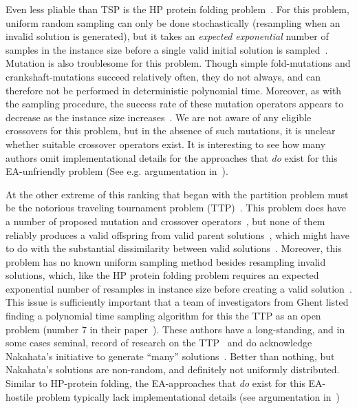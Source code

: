 \documentclass[svgnames,table,runningheads]{llncs}
\begin{document}
Even less pliable than TSP is the HP protein folding problem~\cite{dill1985theory,berger1998protein,lau1989lattice,van2023quantifying,van2026towards}. For this problem, uniform random sampling can only be done stochastically (resampling when an invalid solution is generated), but it takes an \textit{expected exponential} number of samples in the instance size before a single valid initial solution is sampled~\cite{horn2023randomly,jansen2023can}. Mutation is also troublesome for this problem. Though simple fold-mutations and crankshaft-mutations succeed relatively often, they do not always, and can therefore not be performed in deterministic polynomial time. Moreover, as with the sampling procedure, the success rate of these mutation operators appears to decrease as the instance size increases~\cite{horn2023randomly}. We are not aware of any eligible crossovers for this problem, but in the absence of such mutations, it is unclear whether suitable crossover operators exist. It is interesting to see how many authors omit implementational details for the approaches that \textit{do} exist for this EA-unfriendly problem (See e.g. argumentation in~\cite{jansen2023can}).

At the other extreme of this ranking that began with the partition problem must be the notorious traveling tournament problem (TTP)~\cite{easton2001traveling}. This problem does have a number of proposed mutation and crossover operators~\cite{khelifa2017,biajoli2006}, but none of them reliably produces a valid offspring from valid parent solutions~\cite{hassel2026traveling}, which might have to do with the substantial dissimilarity between valid solutions~\cite{loyen2025across,loyen2025different}. Moreover, this problem has no known uniform sampling method besides resampling invalid solutions, which, like the HP protein folding problem requires an expected exponential number of resamples in instance size before creating a valid solution~\cite{verduin2023tooconstrained,verduintraveling,verduin2024rows}. This issue is sufficiently important that a team of investigators from Ghent listed finding a polynomial time sampling algorithm for this the TTP as an open problem (number 7 in their paper~\cite{van2026traveling}). These authors have a long-standing, and in some cases seminal, record of research on the TTP~\cite{van2025column,devriesere2026novel,easton2001traveling} and do acknowledge Nakahata's initiative to generate ``many'' solutions~\cite{nakahatafeasible,nakahata2026constructive}. Better than nothing, but Nakahata's solutions are non-random, and definitely not uniformly distributed. Similar to HP-protein folding, the EA-approaches that \textit{do} exist for this EA-hostile problem typically lack implementational details (see argumentation in~\cite{verduin2024rows})
\end{document}
